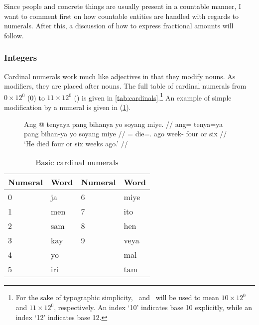 Since people and concrete things are usually present in a countable manner, I
want to comment first on how countable entities are handled with regards to
numerals. After this, a discussion of how to express fractional amounts will
follow.

\subsubsection{Integers}

Cardinal numerals work much like adjectives in that they modify nouns. As
modifiers, they are placed after nouns. The full table of cardinal numerals
from $0 \times 12^0$ (0) to $11 \times 12^0$ (\elv) is given in
\autoref{tab:cardinals}.\footnote{For the sake of typographic simplicity, \ten\
and \elv\ will be used to mean $10 \times 12^0$ and $11 \times 12^0$,
respectively. An index `10' indicates base 10 explicitly, while an index `12'
indicates base 12.} An example of simple modification by a numeral is given in
(\ref{ex:nummod}).

\begin{figure}[h]
\ex\label{ex:nummod}
\begingl
	\gla Ang @ tenyaya pang bihanya yo soyang miye. //
	\glb ang= tenya=ya pang bihan-ya yo soyang miye //
	\glc \AgtT{}= die=\TsgM{}.\Top{} ago week-\Loc{} four or six //
	\glft `He died four or six weeks ago.' //
\endgl
\xe
\end{figure}

\begin{table}[p]\centering
\caption{Basic cardinal numerals}
\begin{tabu} to .75\linewidth {X[c] I X[c] I}
\toprule\tableheaderfont
Numeral
	& Word
	& Numeral
	& Word
	\\
\toprule

0
	& ja %
	& 6
	& miye %
	\\

1
	& men %
	& 7
	& ito %
	\\
	
2
	& sam %
	& 8
	& hen %
	\\
	
3
	& kay %
	& 9
	& veya %
	\\

4
	& yo %
	& \ten
	& mal %
	\\

5
	& iri %
	& \elv
	& tam %
	\\

\bottomrule
\end{tabu}
\label{tab:cardinals}
\end{table}

